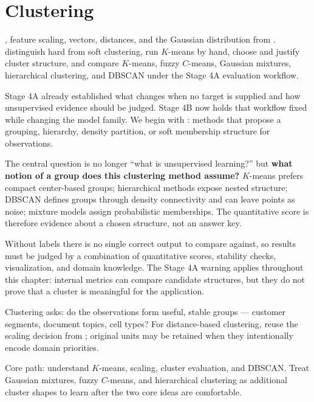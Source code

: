 \chapter{Clustering}
\label{ch:clustering}

\chapterguide%
  {, feature scaling, vectors, distances, and the Gaussian distribution from .}
  {distinguish hard from soft clustering, run $K$-means by hand, choose and justify cluster structure, and compare $K$-means, fuzzy $C$-means, Gaussian mixtures, hierarchical clustering, and DBSCAN under the Stage 4A evaluation workflow.}

Stage 4A already established what changes when no target is supplied and how unsupervised evidence should be judged. Stage 4B now holds that workflow fixed while changing the model family. We begin with : methods that propose a grouping, hierarchy, density partition, or soft membership structure for observations.

The central question is no longer ``what is unsupervised learning?'' but \textbf{what notion of a group does this clustering method assume?} $K$-means prefers compact center-based groups; hierarchical methods expose nested structure; DBSCAN defines groups through density connectivity and can leave points as noise; mixture models assign probabilistic memberships. The quantitative score is therefore evidence about a chosen structure, not an answer key.

Without labels there is no single correct output to compare against, so results must be judged by a combination of quantitative scores, stability checks, visualization, and domain knowledge. The Stage 4A warning applies throughout this chapter: internal metrics can compare candidate structures, but they do not prove that a cluster is meaningful for the application.

Clustering asks: do the observations form useful, stable groups --- customer segments, document topics, cell types? For distance-based clustering, reuse the scaling decision from ; original units may be retained when they intentionally encode domain priorities.

\begin{firstread}
Core path: understand $K$-means, scaling, cluster evaluation, and DBSCAN. Treat Gaussian mixtures, fuzzy $C$-means, and hierarchical clustering as additional cluster shapes to learn after the two core ideas are comfortable.
\end{firstread}

